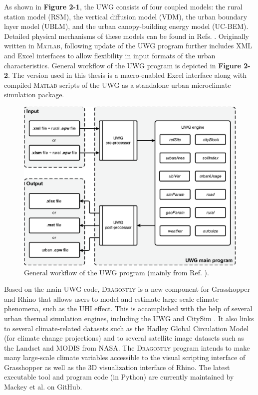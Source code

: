 As shown in \textbf{Figure 2-1}, the UWG consists of four coupled models: the rural station model (RSM), the vertical diffusion model (VDM), the urban boundary layer model (UBLM), and the urban canopy-building energy model (UC-BEM). Detailed physical mechanisms of these models can be found in Refs. \cite{bueno2013urban, bueno2013calculation}. Originally written in \textsc{Matlab}, following update of the UWG program further includes XML \cite{nakano2015urban} and Excel \cite{yang2016curious} interfaces to allow flexibility in input formats of the urban characteristics. General workflow of the UWG program is depicted in \textbf{Figure 2-2}. The version used in this thesis is a macro-enabled Excel interface along with compiled \textsc{Matlab} scripts of the UWG as a standalone urban microclimate simulation package.

\begin{figure}
\centering
\includegraphics[width=.825\linewidth]{UWGEngine.eps}
\caption{General workflow of the UWG program (mainly from Ref. \cite{yang2016curious}).}
\end{figure}

Based on the main UWG code, \textsc{Dragonfly} is a new component for Grasshopper and Rhino that allows users to model and estimate large-scale climate phenomena, such as the UHI effect. This is accomplished with the help of several urban thermal simulation engines, including the UWG and CitySim \cite{robinson2009citysim}. It also links to several climate-related datasets such as the Hadley Global Circulation Model (for climate change projections) and to several satellite image datasets such as the Landset and MODIS from NASA. The \textsc{Dragonfly} program intends to make many large-scale climate variables accessible to the visual scripting interface of Grasshopper as well as the 3D visualization interface of Rhino. The latest executable tool and program code (in Python) are currently maintained by Mackey et al. \cite{mackey2015dragonfly} on GitHub.

